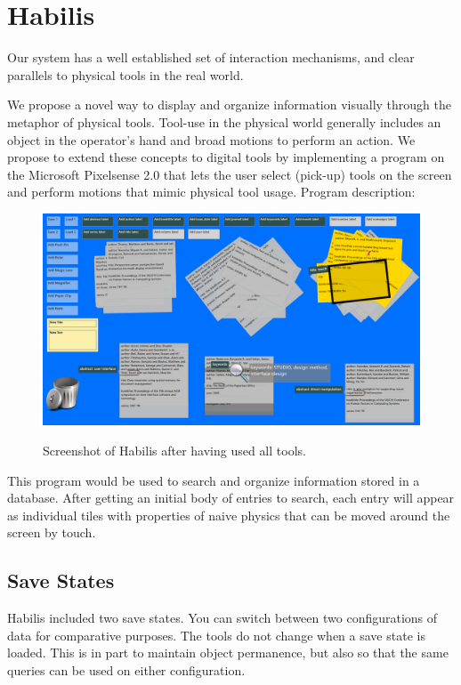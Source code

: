 \documentclass{article}
\begin{document}
\section{Habilis}


Our system has a well established set of interaction mechanisms, and clear parallels to physical tools in the real world.

We propose a novel way to display and organize information visually through the metaphor of physical tools. Tool-use in the physical world generally includes an object in the operator's hand and broad motions to perform an action. We propose to extend these concepts to digital tools by implementing a program on the Microsoft Pixelsense 2.0 that lets the user select (pick-up) tools on the screen and perform motions that mimic physical tool usage. 
Program description:

\begin{figure}[t!]
\centering
\scalebox{.239}
{\includegraphics{HabilisScreenShot.png}}
\caption{Screenshot of Habilis after having used all tools.}
\label{Fig:screenshot}
\end{figure}



This program would be used to search and organize information stored in a database.  After getting an initial body of entries to search, each entry will appear as individual tiles with properties of naive physics that can be moved around the screen by touch. 






\subsection{Save States}
Habilis included two save states.  You can switch between two configurations of data for comparative purposes.  The tools do not change when a save state is loaded.  This is in part to maintain object permanence, but also so that the same queries can be used on either configuration.  
\end{document}
